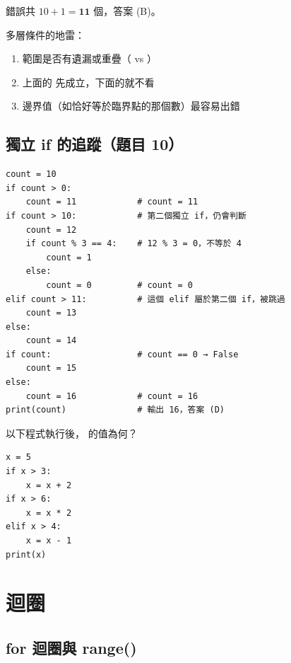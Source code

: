 \documentclass[12pt, a4paper]{ctexart}
\renewcommand{\texttt}[1]{\ic{#1}}
\begin{document}
錯誤共 $10 + 1 = \mathbf{11}$ 個，答案 (B)。

\begin{examwarn}
  多層條件的地雷：
  \begin{enumerate}[label=\arabic*., itemsep=1pt, topsep=2pt, leftmargin=1.5em]
    \item 範圍是否有遺漏或重疊（\texttt{>} vs \texttt{>=}）
    \item 上面的 \texttt{elif} 先成立，下面的就不看
    \item 邊界值（如恰好等於臨界點的那個數）最容易出錯
  \end{enumerate}
\end{examwarn}

\subsection{獨立 if 的追蹤（題目 10）}

\begin{verbatim}
count = 10
if count > 0:
    count = 11            # count = 11
if count > 10:            # 第二個獨立 if，仍會判斷
    count = 12
    if count % 3 == 4:    # 12 % 3 = 0，不等於 4
        count = 1
    else:
        count = 0         # count = 0
elif count > 11:          # 這個 elif 屬於第二個 if，被跳過
    count = 13
else:
    count = 14
if count:                 # count == 0 → False
    count = 15
else:
    count = 16            # count = 16
print(count)              # 輸出 16，答案 (D)
\end{verbatim}

\begin{exercise}[習題 — 條件追蹤]
  以下程式執行後，\texttt{x} 的值為何？
\begin{verbatim}
x = 5
if x > 3:
    x = x + 2
if x > 6:
    x = x * 2
elif x > 4:
    x = x - 1
print(x)
\end{verbatim}
\end{exercise}

\section{迴圈}

\subsection{for 迴圈與 range()}
\end{document}

